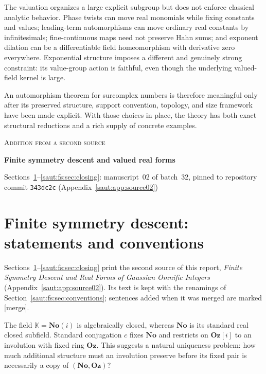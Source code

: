\documentclass[11pt]{article}
\theoremstyle{definition}
\theoremstyle{remark}
\newcommand{\No}{\mathbf{No}}
\newcommand{\K}{\mathbb K}
\newcommand{\Oz}{\mathbf{Oz}}
\newcommand{\mergetag}{\textup{[merge]}}
\numberwithin{equation}{section}
\begin{document}
The valuation organizes a large explicit subgroup but does not enforce
classical analytic behavior. Phase twists can move real monomials while
fixing constants and values; leading-term automorphisms can move ordinary
real constants by infinitesimals; fine-continuous maps need not preserve
Hahn sums; and exponent dilation can be a differentiable field
homeomorphism with derivative zero everywhere. Exponential structure
imposes a different and genuinely strong constraint: its value-group
action is faithful, even though the underlying valued-field kernel is
large.

An automorphism theorem for surcomplex numbers is therefore meaningful only
after its preserved structure, support convention, topology, and size
framework have been made explicit. With those choices in place, the theory
has both exact structural reductions and a rich supply of concrete examples.

\clearpage
{}
{}
\begin{center}
{\large\scshape Addition from a second source\par}
\vspace{0.3em}
{\Large\bfseries\color{ink} Finite symmetry descent and valued real forms\par}
\vspace{0.3em}
{\small Sections~\ref{saut:fs:sec:introduction}--\ref{saut:fs:sec:closing}:
manuscript~02 of batch~32, pinned to repository commit \texttt{343dc2c}
(Appendix~\ref{saut:app:source02})\par}
\end{center}

\section{Finite symmetry descent: statements and conventions}\label{saut:fs:sec:introduction}

Sections~\ref{saut:fs:sec:introduction}--\ref{saut:fs:sec:closing} print the
second source of this report, \emph{Finite Symmetry Descent and Real Forms of
Gaussian Omnific Integers} (Appendix~\ref{saut:app:source02}). Its text is kept
with the renamings of Section~\ref{saut:fs:sec:conventions}; sentences added when
it was merged are marked \mergetag.

The field $\K=\No(i)$ is algebraically closed, whereas $\No$ is its standard real
closed subfield. Standard conjugation $c$ fixes $\No$ and restricts on $\Oz[i]$ to
an involution with fixed ring $\Oz$. This suggests a natural uniqueness problem:
how much additional structure must an involution preserve before its fixed pair
is necessarily a copy of $(\No,\Oz)$?
\end{document}
